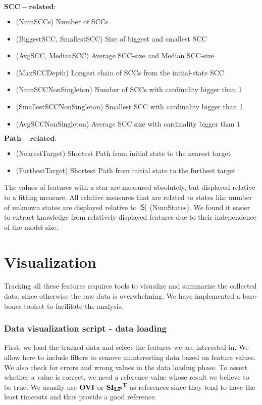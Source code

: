 $\mathbf{SCC-related:}$
\begin{itemize}
\item (NumSCCs) Number of SCCs
\item (BiggestSCC, SmallestSCC) Size of biggest and smallest SCC
\item (AvgSCC, MedianSCC) Average SCC-size and Median SCC-size
\item (MaxSCCDepth) Longest chain of SCCs from the initial-state SCC
\item (NumSCCNonSingleton) Number of SCCs with cardinality bigger than 1
\item (SmallestSCCNonSingleton) Smallest SCC with cardinality bigger than 1
\item (AvgSCCNonSingleton) Average SCC size with cardinality bigger than 1
\end{itemize}

$\mathbf{Path-related}:$
\begin{itemize}
    \item (NearestTarget) Shortest Path from initial state to the nearest target
    \item (FurthestTarget) Shortest Path from initial state to the furthest target
\end{itemize}

The values of features with a star are measured absolutely, but displayed relative to a fitting measure.
All relative measures that are related to states like number of unknown states are displayed relative to $|\mathsf{S}|$ (NumStates).
We found it easier to extract knowledge from relatively displayed features due to their independence of the model size. 

\section{Visualization}

Tracking all these features requires tools to visualize and summarize the collected data, since otherwise the raw data is overwhelming.
We have implemented a bare-bones toolset to facilitate the analysis. 

\subsubsection{Data visualization script - data loading}
First, we load the tracked data and select the features we are interested in. We allow here to include filters to remove uninteresting data based on feature values.
We also check for errors and wrong values in the data loading phase. To assert whether a value is correct, we need a reference value whose result we believe to be true.
We usually use $\mathbf{OVI}$ or $\mathbf{\mathbf{SI_{LP}}^T}$ as references since they tend to have the least timeouts and thus provide a good reference.

